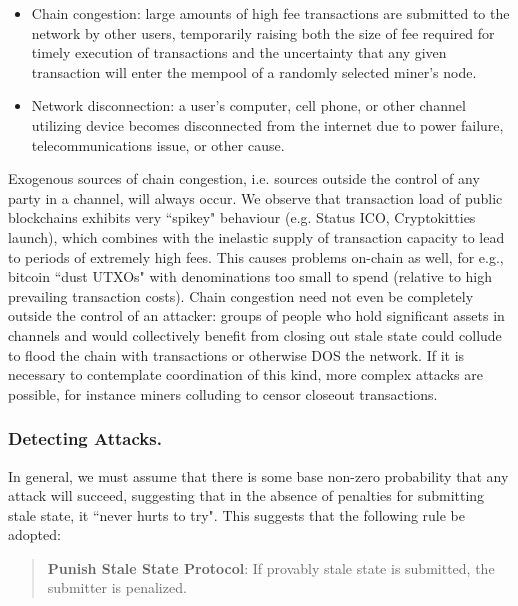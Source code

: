 \documentclass[prb,floatfix,reprint,nofootinbib,amsmath,amssymb,epsfig,pre,floats,letterpaper,groupedaffiliation,tightenlines,allcolors=blue,11pt]{revtex4}
\theoremstyle{definition}
\theoremstyle{definition}
\theoremstyle{definition}
\begin{document}
\begin{itemize}
\item Chain congestion: large amounts of high fee transactions are submitted to the network by other users, temporarily raising both the size of fee required for timely execution of transactions and the uncertainty that any given transaction will enter the mempool of a randomly selected miner's node.
\item Network disconnection: a user's computer, cell phone, or other channel utilizing device becomes disconnected from the internet due to power failure, telecommunications issue, or other cause.
\end{itemize}

Exogenous sources of chain congestion, i.e. sources outside the control of any party in a channel, will always occur. We observe that transaction load of public blockchains exhibits very ``spikey" behaviour (e.g. Status ICO, Cryptokitties launch), which combines with the inelastic supply of transaction capacity to lead to periods of extremely high fees. This causes problems on-chain as well, for e.g., bitcoin ``dust UTXOs" \cite{alcio:dust} with denominations too small to spend (relative to high prevailing transaction costs). Chain congestion need not even be completely outside the control of an attacker: groups of people who hold significant assets in channels and would collectively benefit from closing out stale state could collude to flood the chain with transactions or otherwise DOS the network. If it is necessary to contemplate coordination of this kind, more complex attacks are possible, for instance miners colluding to censor closeout transactions.

\subsubsection{Detecting Attacks.} \label{sec:detectingattacks} In general, we must assume that there is some base non-zero probability that any attack will succeed, suggesting that in the absence of penalties for submitting stale state, it ``never hurts to try". This suggests that the following rule be adopted:

\begin{quote}
\textbf{Punish Stale State Protocol}: If provably stale state is submitted, the submitter is penalized.
\end{quote}
\end{document}
